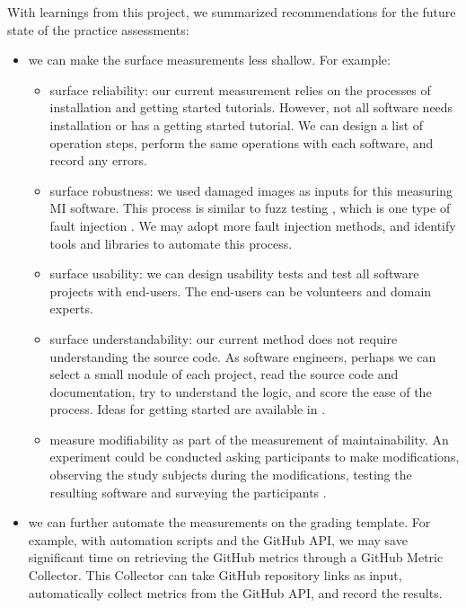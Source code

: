\documentclass[final, 3p, times, authoryear]{elsarticle}
\begin{document}
With learnings from this project, we summarized recommendations for the future
state of the practice assessments:
\begin{itemize}
    \item we can make the surface measurements less shallow. For example:
    \begin{itemize}
        \item surface reliability: our current measurement relies on
        the processes of installation and getting started tutorials. However,
        not all software needs installation or has a getting started tutorial.
        We can design a list of operation steps, perform the same operations
        with each software, and record any errors.
        \item surface robustness: we used damaged images as inputs for
        this measuring MI software. This process is similar to fuzz testing
        \citep{enwiki:1039424308}, which is one type of fault injection
        \citep{enwiki:1039005082}. We may adopt more fault injection methods, and
        identify tools and libraries to automate this process.
        \item surface usability: we can design usability tests and test
        all software projects with end-users. The end-users can be volunteers
        and domain experts.
        \item surface understandability: our current method does not require
        understanding the source code. As software engineers, perhaps we can
        select a small module of each project, read the source code and
        documentation, try to understand the logic, and score the ease of the
        process.  Ideas for getting started are available in
        \citet{SmithEtAl2021}.
        \item measure modifiability as part of the measurement of
        maintainability.  An experiment could be conducted asking participants
        to make modifications, observing the study subjects during the
        modifications, testing the resulting software and surveying the
        participants \citep{SmithEtAl2021}.
    \end{itemize}
	\item we can further automate the measurements on the grading template. For
	example, with automation scripts and the GitHub API, we may save significant
	time on retrieving the GitHub metrics through a GitHub Metric Collector.
	This Collector can take GitHub repository links as input, automatically
	collect metrics from the GitHub API, and record the results.

\end{itemize}
\end{document}
